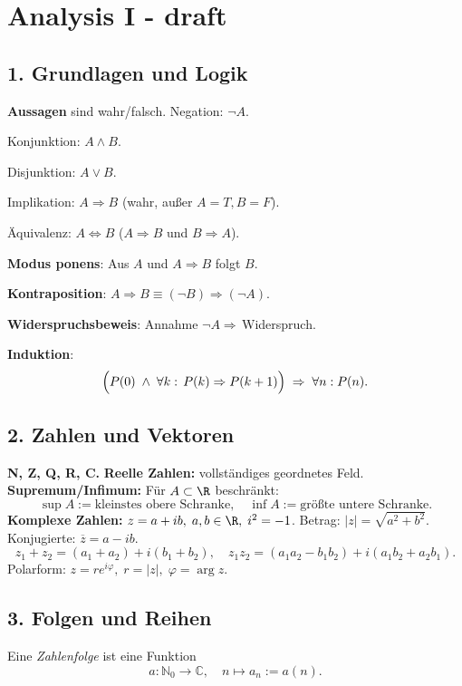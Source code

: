 \section{Analysis I - draft}

\subsection{1. Grundlagen und Logik}
\textbf{Aussagen} sind wahr/falsch.  
Negation: $\lnot A$.  

Konjunktion: $A\wedge B$.  

Disjunktion: $A\vee B$.  

Implikation: $A\Rightarrow B$ (wahr, außer $A=T,B=F$).  

Äquivalenz: $A\Leftrightarrow B$ ($A\Rightarrow B$ und $B\Rightarrow A$). 

\textbf{Modus ponens}: Aus $A$ und $A\Rightarrow B$ folgt $B$.  

\textbf{Kontraposition}: $A\Rightarrow B\equiv(\lnot B)\Rightarrow(\lnot A)$.  

\textbf{Widerspruchsbeweis}: Annahme $\lnot A\Rightarrow\,$Widerspruch.  

\textbf{Induktion}:  
\[
\Bigl(P(0)\;\wedge\;\forall k:\,P(k)\Rightarrow P(k+1)\Bigr)\;\Rightarrow\;\forall n:P(n).
\]

\subsection{2. Zahlen und Vektoren}
\textbf{N, Z, Q, R, C.}  
\textbf{Reelle Zahlen:} vollständiges geordnetes Feld.  
\textbf{Supremum/Infimum:} Für $A\subset\R$ beschränkt:  
\[
\sup A:=\text{kleinstes obere Schranke},\quad
\inf A:=\text{größte untere Schranke}.
\]
\textbf{Komplexe Zahlen:} $z=a+ib,\;a,b\in\R,\;i^2=-1$.  
Betrag: $|z|=\sqrt{a^2+b^2}$.  
Konjugierte: $\overline z=a-ib$.  
\[
z_1+z_2=(a_1+a_2)+i(b_1+b_2),\quad
z_1z_2=(a_1a_2-b_1b_2)+i(a_1b_2+a_2b_1).
\]
Polarform: $z=r e^{i\varphi},\;r=|z|,\;\varphi=\arg z$.

\subsection{3. Folgen und Reihen}  
Eine \emph{ Zahlenfolge} ist eine Funktion  
\[
a : \mathbb{N}_0 \to \mathbb{C}, \quad n \mapsto a_n := a(n).
\]  

